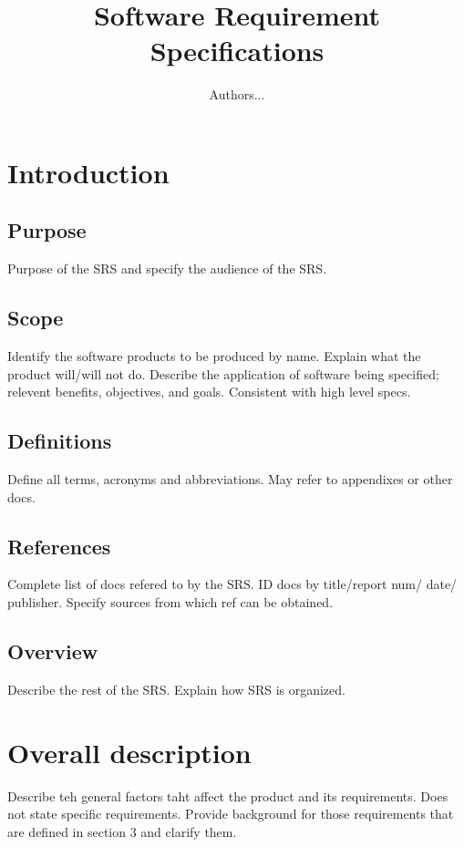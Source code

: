 \documentclass[12pt]{article}
\begin{document}
\title{Software Requirement Specifications}
\author{Authors...}
\date{}
\maketitle

\section{Introduction}
     \subsection{Purpose}
     Purpose of the SRS and specify the audience of the SRS.

     \subsection{Scope}
     Identify the software products to be produced by name. Explain what the product will/will not do. Describe the application of software being specified; relevent benefits, objectives, and goals. Consistent with high level specs.

     \subsection{Definitions}
     Define all terms, acronyms and abbreviations. May refer to appendixes or other docs.

     \subsection{References}
     Complete list of docs refered to by the SRS. ID docs by title/report num/ date/ publisher. Specify sources from which ref can be obtained.

     \subsection{Overview}
     Describe the rest of the SRS. Explain how SRS is organized.

\section{Overall description}
Describe teh general factors taht affect the product and its requirements. Does not state specific requirements. Provide background for those requirements that are defined in section 3 and clarify them.
\end{document}
